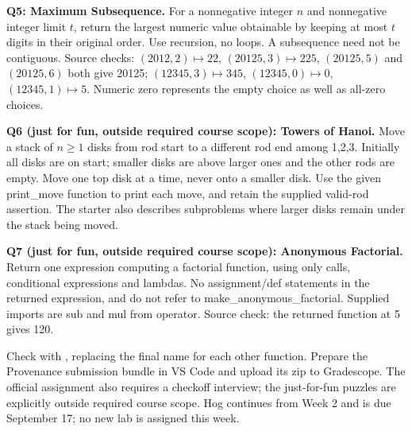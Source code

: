 \begin{prob}
\textbf{Q5: Maximum Subsequence.} For a nonnegative integer $n$ and nonnegative integer limit $t$, return the largest numeric value obtainable by keeping at most $t$ digits in their original order. Use recursion, no loops. A subsequence need not be contiguous. Source checks: $(2012,2)\mapsto22$, $(20125,3)\mapsto225$, $(20125,5)$ and $(20125,6)$ both give 20125; $(12345,3)\mapsto345$, $(12345,0)\mapsto0$, $(12345,1)\mapsto5$. Numeric zero represents the empty choice as well as all-zero choices.\par
{}
\end{prob}
\begin{prob}
\textbf{Q6 (just for fun, outside required course scope): Towers of Hanoi.} Move a stack of $n\ge1$ disks from rod start to a different rod end among 1,2,3. Initially all disks are on start; smaller disks are above larger ones and the other rods are empty. Move one top disk at a time, never onto a smaller disk. Use the given print\_move function to print each move, and retain the supplied valid-rod assertion. The starter also describes subproblems where larger disks remain under the stack being moved.\par
{}
\end{prob}
\begin{prob}
\textbf{Q7 (just for fun, outside required course scope): Anonymous Factorial.} Return one expression computing a factorial function, using only calls, conditional expressions and lambdas. No assignment/def statements in the returned expression, and do not refer to make\_anonymous\_factorial. Supplied imports are sub and mul from operator. Source check: the returned function at 5 gives 120.\par
{}
\end{prob}
\par\noindent\begin{minipage}{\linewidth}
Check with , replacing the final name for each other function. Prepare the Provenance submission bundle in VS Code and upload its zip to Gradescope. The official assignment also requires a checkoff interview; the just-for-fun puzzles are explicitly outside required course scope. Hog continues from Week 2 and is due September 17; no new lab is assigned this week.
\end{minipage}\par

